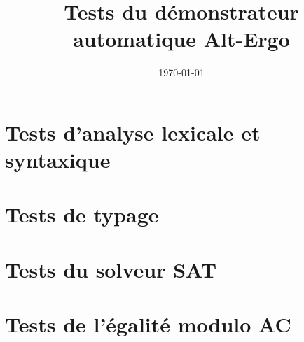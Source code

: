 \documentclass[a4paper,12pt]{article}
\title{\Large Tests du démonstrateur automatique Alt-Ergo}
\date\today
\begin{document}
\maketitle

\tableofcontents

\bigskip\bigskip

\newpage

\section{Tests d'analyse lexicale et syntaxique}







\section{Tests de typage}








\section{Tests du solveur SAT}








\section{Tests de l'égalité modulo AC}






\end{document}

